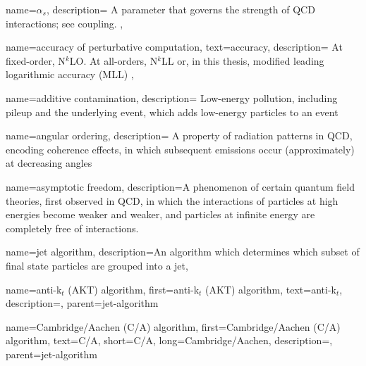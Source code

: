 
{
  name=\ensuremath{\alpha_s},
  description={
      A parameter that governs the strength of QCD interactions; see coupling.
  },
}


{
  name=accuracy of perturbative computation,
  text=accuracy,
  description={
      At fixed-order, N\(^k\)LO.
      At all-orders, N\(^k\)LL or, in this thesis, modified leading logarithmic accuracy (MLL)
  },
}


{
    name=additive contamination,
    description={
        Low-energy pollution, including pileup and the underlying event, which adds low-energy particles to an event
    }
}

{
    name=angular ordering,
    description={
        A property of radiation patterns in QCD, encoding coherence effects, in which subsequent emissions occur (approximately) at decreasing angles
    }
}

{
    name=asymptotic freedom,
    description={A phenomenon of certain quantum field theories, first observed in QCD, in which the interactions of particles at high energies become weaker and weaker, and particles at infinite energy are completely free of interactions.}
}



{
    name=jet algorithm,
    description={An algorithm which determines which subset of final state particles are grouped into a jet},
}

    {
        name=anti-k\(_t\) (AKT) algorithm,
        first={anti-k\(_t\) (AKT) algorithm},
        text={anti-k\(_t\)},
        description={},
        parent=jet-algorithm
    }

    {
        name=Cambridge/Aachen (C/A) algorithm,
        first={Cambridge/Aachen (C/A) algorithm},
        text={C/A},
        short={C/A},
        long={Cambridge/Aachen},
        description={},
        parent=jet-algorithm
    }


